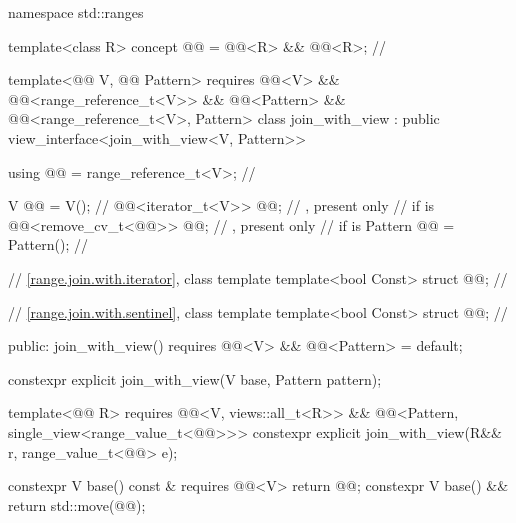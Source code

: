 %
\begin{codeblock}
namespace std::ranges {
  template<class R>
  concept @@ = @@<R> && @@<R>;    // \expos

  template<@@ V, @@ Pattern>
    requires @@<V> && @@<range_reference_t<V>>
          && @@<Pattern>
          && @@<range_reference_t<V>, Pattern>
  class join_with_view : public view_interface<join_with_view<V, Pattern>> {
    using @@ = range_reference_t<V>;                  // \expos

    V @@ = V();                                          // \expos
    @@<iterator_t<V>> @@;         // \expos, present only
                                                            // if  is 
    @@<remove_cv_t<@@>> @@;   // \expos, present only
                                                            // if  is 
    Pattern @@ = Pattern();                           // \expos

    // \ref{range.join.with.iterator}, class template 
    template<bool Const> struct @@;                   // \expos

    // \ref{range.join.with.sentinel}, class template 
    template<bool Const> struct @@;                   // \expos

  public:
    join_with_view()
      requires @@<V> && @@<Pattern> = default;

    constexpr explicit join_with_view(V base, Pattern pattern);

    template<@@ R>
      requires @@<V, views::all_t<R>> &&
               @@<Pattern, single_view<range_value_t<@@>>>
    constexpr explicit join_with_view(R&& r, range_value_t<@@> e);

    constexpr V base() const & requires @@<V> { return @@; }
    constexpr V base() && { return std::move(@@); }

}}
\end{codeblock}

